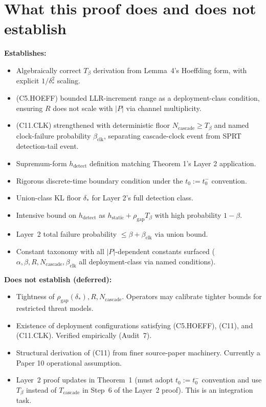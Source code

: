 \documentclass{article}
\newcommand{\deltastar}{\delta_{*}}
\newcommand{\rhogap}{\rho_{\mathrm{gap}}}
\newcommand{\Tbeta}{T_{\beta}}
\newcommand{\Ncasc}{N_{\mathrm{cascade}}}
\newcommand{\bclk}{\beta_{\mathrm{clk}}}
\begin{document}
\section{What this proof does and does not establish}

\textbf{Establishes:}
\begin{itemize}
\item Algebraically correct $\Tbeta$ derivation from Lemma~4's
  Hoeffding form, with explicit $1/\deltastar^2$ scaling.
\item (C5.HOEFF) bounded LLR-increment range as a deployment-class
  condition, ensuring $R$ does not scale with $|P|$ via channel
  multiplicity.
\item (C11.CLK) strengthened with deterministic floor $\Ncasc \geq
  \Tbeta$ and named clock-failure probability $\bclk$, separating
  cascade-clock event from SPRT detection-tail event.
\item Supremum-form $h_{\mathrm{detect}}$ definition matching
  Theorem 1's Layer 2 application.
\item Rigorous discrete-time boundary condition under the
  $t_0 := t_0^-$ convention.
\item Union-class KL floor $\deltastar$ for Layer 2's full
  detection class.
\item Intensive bound on $h_{\mathrm{detect}}$ as $h_{\mathrm{static}}
  + \rhogap \Tbeta$ with high probability $1-\beta$.
\item Layer~2 total failure probability $\leq \beta + \bclk$ via
  union bound.
\item Constant taxonomy with all $|P|$-dependent constants surfaced
  ($\alpha, \beta, R, \Ncasc, \bclk$ all deployment-class via
  named conditions).
\end{itemize}

\textbf{Does not establish (deferred):}
\begin{itemize}
\item Tightness of $\rhogap(\deltastar), R, \Ncasc$.  Operators
  may calibrate tighter bounds for restricted threat models.
\item Existence of deployment configurations satisfying (C5.HOEFF),
  (C11), and (C11.CLK).  Verified empirically (Audit~7).
\item Structural derivation of (C11) from finer source-paper
  machinery.  Currently a Paper 10 operational assumption.
\item Layer~2 proof updates in Theorem~1 (must adopt $t_0 := t_0^-$
  convention and use $\Tbeta$ instead of $T_{\mathrm{cascade}}$ in
  Step~6 of the Layer~2 proof).  This is an integration task.
\end{itemize}
\end{document}
